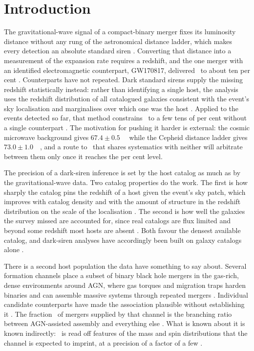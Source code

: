 \section{Introduction}
\label{sec:intro}

The gravitational-wave signal of a compact-binary merger fixes its luminosity
distance without any rung of the astronomical distance ladder, which makes
every detection an absolute standard siren \citep{Schutz1986, HolzHughes2005}.
Converting that distance into a measurement of the expansion rate requires a
redshift, and the one merger with an identified electromagnetic counterpart,
GW170817, delivered \Hz\ to about ten per cent \citep{Abbott2017SirenH0}.
Counterparts have not repeated. Dark standard sirens supply the missing
redshift statistically instead: rather than identifying a single host, the
analysis uses the redshift distribution of all catalogued galaxies consistent
with the event's sky localisation and marginalises over which one was the host
\citep{DelPozzo2012}. Applied to the events detected so far, that method
constrains \Hz\ to a few tens of per cent without a single counterpart
\citep{Fishbach2019, Palmese2023, GWTC3Cosmo2023, GWTC4Cosmo2025}. The
motivation for pushing it harder is external: the cosmic microwave background
gives $67.4 \pm 0.5$~\kmsmpc\ \citep{Planck2018} while the Cepheid distance
ladder gives $73.0 \pm 1.0$~\kmsmpc\ \citep{Riess2022}, and a route to \Hz\
that shares systematics with neither will arbitrate between them only once it
reaches the per cent level.

The precision of a dark-siren inference is set by the host catalog as much as
by the gravitational-wave data. Two catalog properties do the work. The first
is how sharply the catalog pins the redshift of a host given the event's sky
patch, which improves with catalog density and with the amount of structure in
the redshift distribution on the scale of the localisation
\citep{Fishbach2019, Gray2020}. The second is how well the galaxies the survey
missed are accounted for, since real catalogs are flux limited and beyond some
redshift most hosts are absent
\citep{ChenFishbachHolz2018, Finke2021, Gray2022}. Both favour the densest
available catalog, and dark-siren analyses have accordingly been built on
galaxy catalogs alone \citep{Palmese2023, GWTC3Cosmo2023}.

There is a second host population the data have something to say about. Several
formation channels place a subset of binary black hole mergers in the gas-rich,
dense environments around AGN, where gas torques and migration traps harden
binaries and can assemble massive systems through repeated mergers
\citep{Bartos2017, StoneMetzgerHaiman2017, McKernan2018,
TagawaHaimanKocsis2020}. Individual candidate counterparts have made the
association plausible without establishing it
\citep{Graham2020, Gayathri2021, BomPalmese2023}. The fraction \fagn\ of
mergers supplied by that channel is the branching ratio between AGN-assisted
assembly and everything else \citep{FordMcKernan2022}. What is known about it
is known indirectly: \fagn\ is read off features of the mass and spin
distributions that the channel is expected to imprint, at a precision of a
factor of a few \citep{McKernan2018, FordMcKernan2022}.

